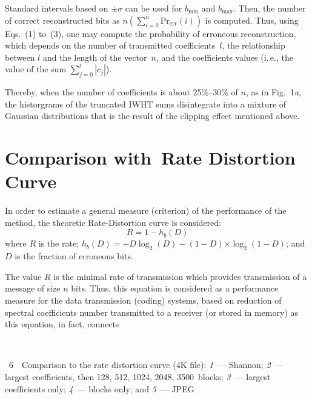 \begin{multicols}{2}
Standard intervals based on $\pm\sigma$ can be used for
$b_{\min}$ and $b_{\max}$. Then, the number of correct
reconstructed bits as $n\left(\sum\limits_{i=0}^{n} \mathrm{Pr}_{\mathrm{err}}(i)\right)$ is computed.
%
Thus, using Eqs.~(1) to~(3), one may compute the probability of
erroneous reconstruction, which depends on the number of
transmitted coefficients~$l$, the relationship between $l$ and the
length of the vector~$n$, and the coefficients values (i.\,e., the
value of the sum $\sum\limits_{j=0}^{l} |c_j|$). 

Thereby, when the number 
of coefficients is about 25\%--30\% of $n$, as in Fig.~1\textit{a}, 
the historgrams of the truncated IWHT sums disintegrate into a mixture 
of Gaussian distributions that is the result of the clipping effect mentioned above.

\section{Comparison with~Rate Distortion Curve}

\noindent
In order to estimate a general measure (criterion) of the performance 
of the method, the theoretic Rate-Distortion curve is considered:
$$
R=1-h_b(D)
$$
where $R$ is the rate;
$
h_b(D)= -D\log_2(D)-(1-D)$\linebreak $\times\log_2(1-D)$; and
$D$ is the fraction of erroneous bits.

 The value $R$ is the minimal rate of transmission which provides transmission 
 of a message of size $n$ bits.
Thus,  this equation is considered as a performance measure for the data
transmission (coding) systems, based on reduction of
 spectral coefficients number 
transmitted to a receiver
 (or stored in memory) as this equation, in fact, connects\linebreak\vspace*{-12pt}
\begin{center}  %
\vspace*{12pt}
\mbox{%
 \epsfxsize=77.91mm
 }
 \end{center}
 \vspace*{-3pt}
{{\figurename~6}\ \ \small{Comparison to the rate distortion curve
(4K file): \textit{1}~--- Shannon;
  \textit{2}~--- largest coefficients, then 128, 512, 1024, 2048, 3500~blocks;
  \textit{3}~--- largest coefficients only; \textit{4}~--- blocks only; and
  \textit{5}~--- JPEG}}





\end{multicols}
